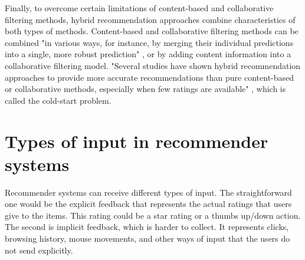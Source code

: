 Finally, to overcome certain limitations of content-based and collaborative filtering methods, hybrid recommendation approaches combine characteristics of both types of methods. Content-based and collaborative filtering methods can be combined "in various ways, for instance, by merging their individual predictions into a single, more robust prediction" \cite{desrosiers2011comprehensive}, or by adding content information into a collaborative filtering model. "Several studies have shown hybrid recommendation approaches to provide more accurate recommendations than pure content-based or collaborative methods, especially when few ratings are available" \cite{desrosiers2011comprehensive},  which is called the cold-start problem.

\section{Types of input in recommender systems}

Recommender systems can receive different types of input. The straightforward one would be the explicit feedback that represents the actual ratings that users give to the items. This rating could be a star rating or a thumbs up/down action. The second is implicit feedback, which is harder to collect. It represents clicks, browsing history, mouse movements, and other ways of input that the users do not send explicitly.

